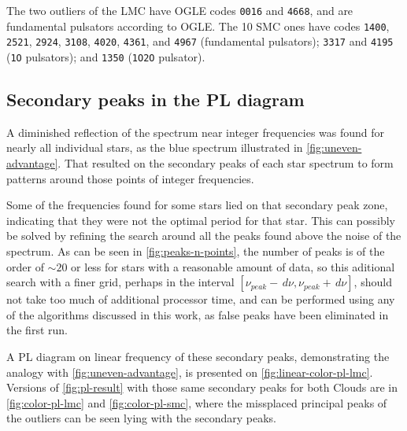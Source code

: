 The two outliers of the LMC have OGLE codes \texttt{0016} and \texttt{4668}, and are fundamental pulsators according to OGLE.
The 10 SMC ones have codes 
\texttt{1400}, 
\texttt{2521}, 
\texttt{2924}, 
\texttt{3108}, 
\texttt{4020}, 
\texttt{4361}, and
\texttt{4967} (fundamental pulsators);
\texttt{3317} and
\texttt{4195} (\texttt{1O} pulsators); and 
\texttt{1350} (\texttt{1O2O} pulsator).


\subsection{Secondary peaks in the PL diagram}

A diminished reflection of the spectrum near integer frequencies was found for nearly all individual stars,
as the blue spectrum illustrated in \autoref{fig:uneven-advantage}.
That resulted on the secondary peaks of each star spectrum to form patterns around those points of integer frequencies.

Some of the frequencies found for some stars lied on that secondary peak zone, indicating that they were not the optimal period for that star.
This can possibly be solved by refining the search around all the peaks found above the noise of the spectrum.
As can be seen in \autoref{fig:peaks-n-points}, the number of peaks is of the order of $\sim20$ or less for stars with a reasonable amount of data,
so this aditional search with a finer grid, perhaps in the interval $[\nu_{peak}-\,d\nu,\nu_{peak}+\,d\nu]$, should not take too much of additional processor time,
and can be performed using any of the algorithms discussed in this work, as false peaks have been eliminated in the first run.

A PL diagram on linear frequency of these secondary peaks, demonstrating the analogy with \autoref{fig:uneven-advantage}, is presented on \autoref{fig:linear-color-pl-lmc}.
Versions of \autoref{fig:pl-result} with those same secondary peaks for both Clouds are in \autoref{fig:color-pl-lmc} and \autoref{fig:color-pl-smc},
where the missplaced principal peaks of the outliers can be seen lying with the secondary peaks.


